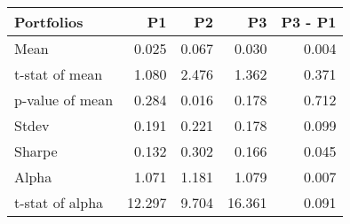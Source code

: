 \begin{tabular}{lrrrr}
\toprule
Portfolios & P1 & P2 & P3 & P3 - P1 \\
\midrule
Mean & 0.025 & 0.067 & 0.030 & 0.004 \\
t-stat of mean & 1.080 & 2.476 & 1.362 & 0.371 \\
p-value of mean & 0.284 & 0.016 & 0.178 & 0.712 \\
Stdev & 0.191 & 0.221 & 0.178 & 0.099 \\
Sharpe & 0.132 & 0.302 & 0.166 & 0.045 \\
Alpha & 1.071 & 1.181 & 1.079 & 0.007 \\
t-stat of alpha & 12.297 & 9.704 & 16.361 & 0.091 \\
\bottomrule
\end{tabular}
